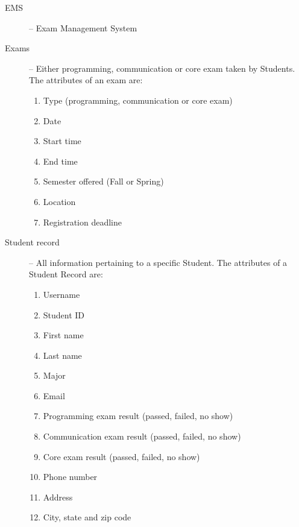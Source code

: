 
\begin{description}
   \item[EMS] -- Exam Management System 
   \item[Exams]\label{def:exam} --  Either programming,
      communication or core exam taken by Students. The attributes of an exam
      are:
      \begin{enumerate}
         \item Type (programming, communication or core exam)
         \item Date
         \item Start time
         \item End time
         \item Semester offered (Fall or Spring)
         \item Location
         \item Registration deadline
      \end{enumerate}
   \item[Student record]\label{def:record} --  All
      information pertaining to a specific Student. The attributes of a Student
      Record are:
      \begin{enumerate}
         \item Username
         \item Student ID
         \item First name
         \item Last name
         \item Major
         \item Email
         \item Programming exam result (passed, failed, no show)
         \item Communication exam result (passed, failed, no show)
         \item Core exam result (passed, failed, no show)
         \item Phone number
         \item Address
         \item City, state and zip code
      \end{enumerate}
\end{description}


